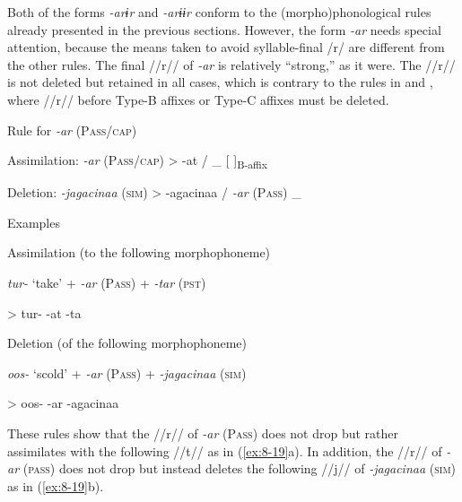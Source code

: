 Both of the forms \textit{{}-arɨr} and \textit{{}-arɨɨr} conform to the (morpho)phonological rules already presented in the previous sections. However, the form \textit{{}-ar} needs special attention, because the means taken to avoid syllable-final /r/ are different from the other rules. The final //r// of \textit{{}-ar} is relatively “strong,” as it were. The //r// is not deleted but retained in all cases, which is contrary to the rules in  and , where //r// before Type-B affixes or Type-C affixes must be deleted.

\ea\label{ex:8-18}
  Rule for \textit{{}-ar} (P\textsc{ass}/\textsc{cap})

\ea Assimilation:  \textit{{}-ar} (P\textsc{ass}/\textsc{cap})  >  {}-at  /  \_  [  ]\textsubscript{B-affix}

\ex Deletion:  \textit{{}-jagacinaa} (\textsc{sim})  >  {}-agacinaa  /  \textit{{}-ar} (P\textsc{ass})  \_
\z

\ea\label{ex:8-19}
  Examples

\ea Assimilation (to the following morphophoneme)

      \textit{tur-}  ‘take’  +  \textit{{}-ar} (P\textsc{ass})  +  \textit{{}-tar} (\textsc{pst})

    >  tur-      {}-at      {}-ta  

\ex Deletion (of the following morphophoneme)

      \textit{oos-}  ‘scold’  +  \textit{{}-ar} (P\textsc{ass})  +  \textit{{}-jagacinaa} (\textsc{sim})

    >  oos-      {}-ar      {}-agacinaa  
\z

These rules show that the //r// of \textit{{}-ar} (P\textsc{ass}) does not drop but rather assimilates with the following //t// as in (\ref{ex:8-19}a). In addition, the //r// of \textit{{}-ar} (\textsc{pass}) does not drop but instead deletes the following //j// of \textit{{}-jagacinaa} (\textsc{sim}) as in (\ref{ex:8-19}b).

